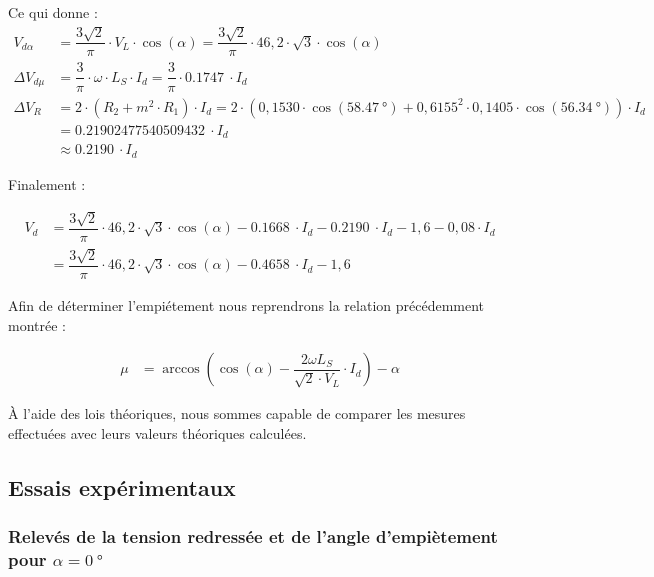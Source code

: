 \documentclass[a4paper, 11pt, openany, oneside, french]{article}
\begin{document}
Ce qui donne :
\begin{align*}
    V_{d\alpha} &= \dfrac{3\sqrt{2}}{\pi} \cdot V_L \cdot \cos{\left(\alpha \right)} = \dfrac{3\sqrt{2}}{\pi} \cdot 46,2 \cdot \sqrt{3} \cdot \cos{\left(\alpha \right)}\\
    \Delta V_{d\mu} &= \dfrac{3}{\pi} \cdot \omega \cdot L_S \cdot I_d = \dfrac{3}{\pi} \cdot \SI{0.1747}{} \cdot I_d\\
    \Delta V_R &= 2 \cdot \left(R_2 + m^2 \cdot R_1 \right)\cdot I_d = 2 \cdot \left(0,1530 \cdot \cos{\left(\SI{58.47}{\degree} \right)} + 0,6155^2 \cdot 0,1405 \cdot \cos{\left(\SI{56.34}{\degree} \right)} \right)\cdot I_d\\
    &= \SI{0.21902477540509432}{}\cdot I_d\\
    &\approx \SI{0.2190}{}\cdot I_d
\end{align*}

Finalement :

\begin{align*}
    V_d &= \dfrac{3\sqrt{2}}{\pi} \cdot 46,2 \cdot \sqrt{3} \cdot \cos{\left(\alpha \right)} - \SI{0.1668}{} \cdot I_d - \SI{0.2190}{}\cdot I_d - 1,6 - 0,08 \cdot I_d\\
    &= \dfrac{3\sqrt{2}}{\pi} \cdot 46,2 \cdot \sqrt{3} \cdot \cos{\left(\alpha \right)} - \SI{0.4658}{} \cdot I_d - 1,6
\end{align*}

Afin de déterminer l'empiétement nous reprendrons la relation précédemment montrée :

\begin{align*}
    \mu &= \arccos{\left(\cos{\left(\alpha \right)} - \dfrac{2 \omega L_S}{\sqrt{2} \cdot V_L}\cdot I_d\right)} - \alpha
\end{align*}

À l'aide des lois théoriques, nous sommes capable de comparer les mesures effectuées avec leurs valeurs théoriques calculées.

\clearpage
\subsection{Essais expérimentaux}
\subsubsection{Relevés de la tension redressée et de l'angle d'empiètement pour $\alpha = \SI{0}{\degree}$}
\end{document}
